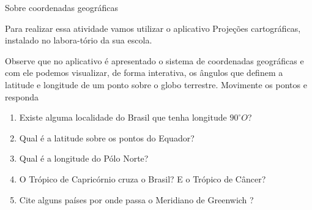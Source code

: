 \begin{task}{Sobre coordenadas geográficas} 

Para realizar essa atividade vamos utilizar o aplicativo Projeções cartográficas, instalado no labora-tório da sua escola.

Observe que no aplicativo é apresentado o sistema de coordenadas geográficas e com ele podemos  visualizar, de forma interativa, os ângulos que definem a latitude e longitude de um ponto sobre o globo terrestre. Movimente os pontos e responda
\begin{enumerate}
\item Existe alguma localidade do Brasil que tenha longitude $90^{\circ} O$? 
\item Qual é a latitude sobre os pontos do Equador? 
\item Qual é a longitude do Pólo Norte? 
\item O Trópico de Capricórnio cruza o Brasil? E o Trópico de Câncer? 
\item Cite alguns países por onde passa o Meridiano de Greenwich ?
\end{enumerate}
\end{task}

